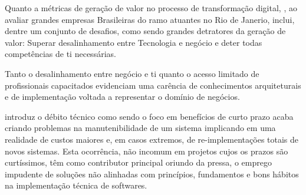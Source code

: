     Quanto a métricas de geração de valor no processo de transformação digital,
    , ao avaliar grandes empresas Brasileiras
    do ramo atuantes no Rio de Janerio, inclui, dentre um conjunto de desafios, como
    sendo grandes detratores da geração de valor: Superar desalinhamento entre Tecnologia e negócio
    e deter todas competências de \ac{ti} necessárias.

    Tanto o desalinhamento entre negócio e \ac{ti} quanto o acesso limitado de profissionais capacitados
    evidenciam uma carência de conhecimentos arquiteturais e de implementação voltada a
    representar o domínio de negócios.

     introduz o débito técnico como
    sendo o foco em benefícios de curto prazo acaba criando problemas na manutenibilidade
    de um sistema implicando em uma realidade de custos maiores e, em casos extremos,
    de re-implementações totais de novos sistemas. Esta ocorrência, não incomum em
    projetos cujos os prazos são curtíssimos, têm como contributor principal
    oriundo da pressa, o emprego impudente de soluções não alinhadas com princípios, 
    fundamentos e bons hábitos na implementação técnica de softwares.

    
    
    
    

\newpage
